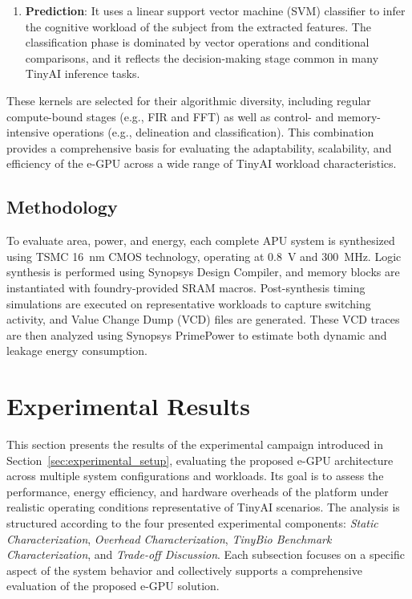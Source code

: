 \begin{itemize}
\begin{enumerate}[label=(\alph*)]
                    \item \textbf{Prediction}: It uses a linear support vector machine (SVM) classifier to infer the cognitive workload of the subject from the extracted features. The classification phase is dominated by vector operations and conditional comparisons, and it reflects the decision-making stage common in many TinyAI inference tasks.
                \end{enumerate}
        
                These kernels are selected for their algorithmic diversity, including regular compute-bound stages (e.g., FIR and FFT) as well as control- and memory-intensive operations (e.g., delineation and classification). This combination provides a comprehensive basis for evaluating the adaptability, scalability, and efficiency of the \mbox{e-GPU} across a wide range of TinyAI workload characteristics.
            \end{itemize}

        \subsection{Methodology}
        
            To evaluate area, power, and energy, each complete APU system is synthesized using TSMC \SI{16}{\nano\meter} CMOS technology, operating at \SI{0.8}{\volt} and \SI{300}{\mega\hertz}. Logic synthesis is performed using Synopsys Design Compiler, and memory blocks are instantiated with foundry-provided SRAM macros. Post-synthesis timing simulations are executed on representative workloads to capture switching activity, and Value Change Dump (VCD) files are generated. These VCD traces are then analyzed using Synopsys PrimePower to estimate both dynamic and leakage energy consumption.

    \section{Experimental Results}
    \label{sec:experimental_results}

        This section presents the results of the experimental campaign introduced in Section~\ref{sec:experimental_setup}, evaluating the proposed \mbox{e-GPU} architecture across multiple system configurations and workloads. Its goal is to assess the performance, energy efficiency, and hardware overheads of the platform under realistic operating conditions representative of TinyAI scenarios. The analysis is structured according to the four presented experimental components: \textit{Static Characterization}, \textit{Overhead Characterization}, \textit{TinyBio Benchmark Characterization}, and \textit{Trade-off Discussion}. Each subsection focuses on a specific aspect of the system behavior and collectively supports a comprehensive evaluation of the proposed \mbox{e-GPU} solution.

